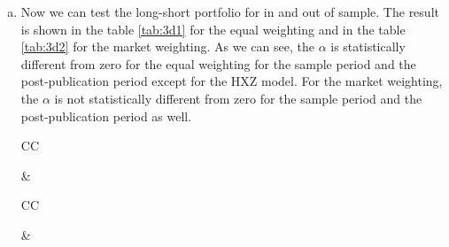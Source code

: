 \begin{enumerate}[(a)]
You can find the result of the test in the table \ref{tab:3c} for CAPM, Fama-French 3 factors, Fama-French 5 factors, Carhart, and HXZ models. 
\begin{table}[htbp!]
    \caption{$\alpha$ test for long-short portfolio with different models}
    \label{tab:3c}
    \begin{tabularx}{\linewidth}{CC}
        \caption*{Equal Weighted }
        
        &
        \caption*{Market Weighted }
        
    \end{tabularx}
\end{table}
\item 
Now we can test the long-short portfolio for in and out of sample. The result is shown in the table \ref{tab:3d1} for the equal weighting and in the table \ref{tab:3d2} for the market weighting. As we can see, the $\alpha$ is statistically different from zero for the equal weighting for the sample period and the post-publication period except for the HXZ model. For the market weighting, the $\alpha$ is not statistically different from zero for the sample period and the post-publication period as well.
\begin{table}[htbp]
    \caption{$\alpha$ test long-short portfolio for in and out of sample with equal weighting}
    \label{tab:3d1}
    \begin{tabularx}{\linewidth}{CC}
        \caption*{Sample period }
        
        &
        \caption*{Post-publication period}
        
    \end{tabularx}
\end{table}

\begin{table}[htbp]
    \caption{$\alpha$ test long-short portfolio for in and out of sample with market weighting}
    \label{tab:3d2}
    \begin{tabularx}{\linewidth}{CC}
        \caption*{Sample period }
        
        &
        \caption*{Post-publication period}
        
    \end{tabularx}
\end{table}


\end{enumerate}